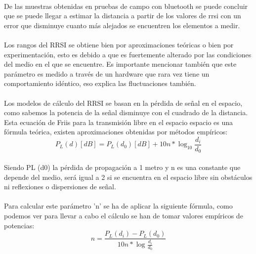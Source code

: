 \documentclass[paper=a4, fontsize=11pt,twoside]{scrartcl}	%
\begin{document}
            \paragraph{}
            De las muestras obtenidas en pruebas de campo con bluetooth se puede concluir que se puede llegar a estimar la distancia
            a partir de los valores de rrsi con un error que disminuye cuanto más alejados se encuentren los elementos a medir. 
            \paragraph{}
            Los rangos del RRSI se obtiene bien por aproximaciones teóricas o bien por experimentación, esto es debido a que 
            es fuertemente alterado por las condiciones del medio en el que se encuentre. Es importante mencionar también que
            este parámetro es medido a través de un hardware que rara vez tiene un comportamiento idéntico, eso explica las fluctuaciones 
            también.
            \paragraph{}
            Los modelos de cálculo del RRSI se basan en la pérdida de señal en el espacio, como sabemos la potencia de la señal
            disminuye con el cuadrado de la distancia. Esta ecuación de Friis para la transmisión libre en el espacio espacio es 
            una fórmula teórica, existen aproximaciones obtenidas por métodos empíricos:
            \begin{equation}
                P_L(d) [dB] = P_L(d_0) [dB] + 10n * \log_{10} \frac{d_i}{d_0} 
            \end{equation}
            \paragraph{}
            Siendo PL (d0) la pérdida de propagación a 1 metro y n es una constante que depende del medio, será igual
            a 2 si se encuentra en el espacio libre sin obstáculos ni reflexiones o dispersiones de señal.
            \paragraph{}
            Para calcular este parámetro 'n' se ha de aplicar la siguiente fórmula, como podemos ver para llevar a cabo el 
            cálculo se han de tomar valores empíricos de potencias:
            \begin{equation}
                n = \frac{ P_L(d_i) - P_L(d_0) }{10n*\log_{}\frac{d_i}{d_0}}
            \end{equation}
\end{document}
